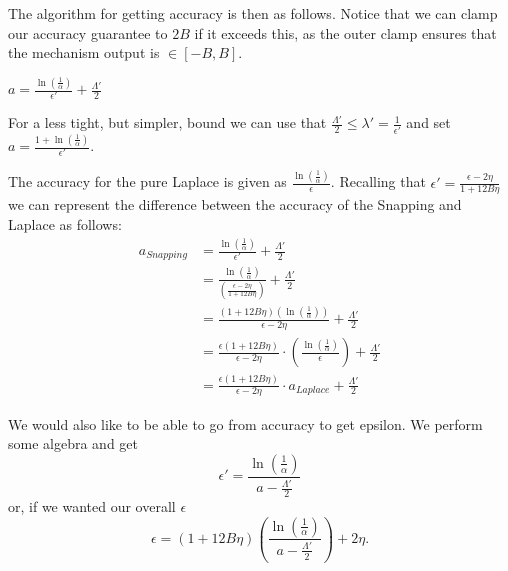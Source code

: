 \documentclass[11pt]{scrartcl} %
\begin{document}
The algorithm for getting accuracy is then as follows. Notice that we can clamp our accuracy guarantee to $2B$ if it
exceeds this, as the outer clamp ensures that the mechanism output is $\in [-B, B]$.
\begin{algorithm}
	\label{GetAccuracy2}
	\begin{algorithmic}
			\State $a = \frac{\ln \left( \frac{1}{\alpha} \right)}{\epsilon'} + \frac{\Lambda'}{2}$
					\State{}
			\Else{}
				\State{}
			\EndIf
		\EndFunction
	\end{algorithmic}
\end{algorithm}

For a less tight, but simpler, bound we can use that $\frac{\Lambda'}{2} \leq \lambda' = 
\frac{1}{\epsilon'}$ and set $a = \frac{1 + \ln \left( \frac{1}{\alpha} \right)}{\epsilon'}$. \newline 

The accuracy for the pure Laplace is given as $\frac{\ln \left( \frac{1}{\alpha} \right)}{\epsilon}$. Recalling that
$\epsilon' = \frac{\epsilon - 2\eta}{1 + 12B\eta}$ we can represent the difference between the accuracy of the
Snapping and Laplace as follows:
\begin{align*}
	a_{Snapping} &= \frac{\ln \left( \frac{1}{\alpha} \right)}{\epsilon'} + \frac{\Lambda'}{2} \\
	&= \frac{\ln \left( \frac{1}{\alpha} \right)}{\left( \frac{\epsilon - 2\eta}{1 + 12B\eta} \right)} + \frac{\Lambda'}{2} \\
	&= \frac{(1 + 12B \eta) \left(\ln \left( \frac{1}{\alpha} \right) \right)}{\epsilon - 2\eta} + \frac{\Lambda'}{2} \\
	&= \frac{\epsilon(1 + 12B \eta)}{\epsilon - 2\eta } \cdot \left(\frac{\ln \left( \frac{1}{\alpha} \right)}{\epsilon} \right) + \frac{\Lambda'}{2} \\
	&= \frac{\epsilon(1 + 12B \eta)}{\epsilon - 2\eta} \cdot a_{Laplace} + \frac{\Lambda'}{2}
\end{align*}

We would also like to be able to go from accuracy to get epsilon. We perform some algebra
and get
\[ \epsilon' = \frac{\ln\left( \frac{1}{\alpha} \right)}{a - \frac{\Lambda'}{2}} \]
or, if we wanted our overall $\epsilon$
\begin{equation}
	\label{eq:accuracy_to_overall_epsilon}
	\epsilon = (1+12B\eta) \left( \frac{\ln\left( \frac{1}{\alpha} \right)}{a - \frac{\Lambda'}{2}} \right) + 2\eta.
\end{equation}
\end{document}

